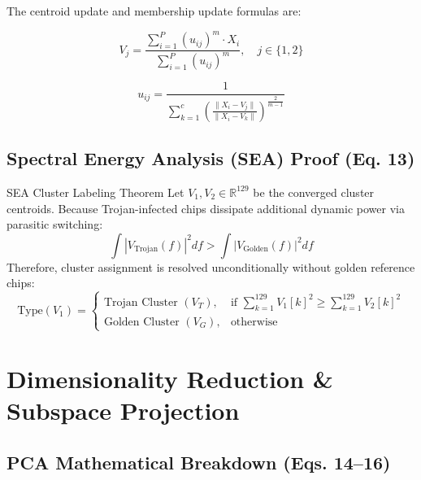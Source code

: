\documentclass[11pt,a4paper,oneside]{book}
\begin{document}
The centroid update and membership update formulas are:

\begin{equation}
V_j = \frac{\sum_{i=1}^{P} (u_{ij})^m \cdot X_i}{\sum_{i=1}^{P} (u_{ij})^m}, \quad j \in \{1, 2\}
\end{equation}

\begin{equation}
u_{ij} = \frac{1}{\sum_{k=1}^{c} \left( \frac{\|X_i - V_j\|}{\|X_i - V_k\|} \right)^{\frac{2}{m-1}}}
\end{equation}

\section{Spectral Energy Analysis (SEA) Proof (Eq. 13)}

\begin{defbox}{SEA Cluster Labeling Theorem}
Let $V_1, V_2 \in \mathbb{R}^{129}$ be the converged cluster centroids. Because Trojan-infected chips dissipate additional dynamic power via parasitic switching:
\begin{equation}
\int |V_{\text{Trojan}}(f)|^2 df > \int |V_{\text{Golden}}(f)|^2 df
\end{equation}
Therefore, cluster assignment is resolved unconditionally without golden reference chips:
\begin{equation}
\text{Type}(V_1) = \begin{cases} \text{Trojan Cluster } (V_T), & \text{if } \sum_{k=1}^{129} V_1[k]^2 \ge \sum_{k=1}^{129} V_2[k]^2 \\ \text{Golden Cluster } (V_G), & \text{otherwise} \end{cases}
\end{equation}
\end{defbox}

\chapter[Dimensionality Reduction \& Subspace Projection]{Dimensionality Reduction \&\\ Subspace Projection}

\section{PCA Mathematical Breakdown (Eqs. 14--16)}
\end{document}
